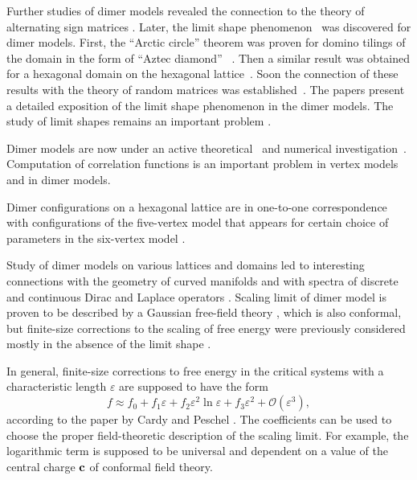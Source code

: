 \documentclass{article}
\begin{document}
Further studies of dimer models revealed the connection to the theory of alternating sign matrices
\cite{elkies1992alternating1,elkies1992alternating2}. Later, the limit shape
phenomenon~\cite{vershik1977kerov} was discovered for dimer models. First, the ``Arctic circle''
theorem was proven for domino tilings of the domain in the form of ``Aztec diamond''
~\cite{1998math......1068J}. Then a similar result was obtained for a hexagonal domain on the
hexagonal lattice~\cite{cohn1998shape}. Soon the connection of these results with the theory of
random matrices was established~\cite{johansson2002non}. The papers
\cite{kenyon2006dimers,kenyon2009lectures} present a detailed exposition of the limit shape
phenomenon in the dimer models. The study of limit shapes remains an important problem
\cite{borodin2010q,di2018tangent}.

Dimer models are now under an active
theoretical~\cite{zj2000,ferrari} and numerical investigation~\cite{ks2018}. Computation of
correlation functions is an important problem in vertex models \cite{colomo2012approach} and in dimer models.

Dimer configurations on a hexagonal lattice are in one-to-one correspondence with configurations of
the five-vertex model that appears for certain choice of parameters in the six-vertex model
\cite{kapitonov2012weighted,kapitonov2008five}.

Study of dimer models on various lattices and domains led to interesting connections with the
geometry of curved manifolds and with spectra of discrete and continuous Dirac and Laplace operators
\cite{kenyon2002laplacian,kenyon2000asymptotic}. Scaling limit of dimer model is proven to be
described by a Gaussian free-field theory \cite{kenyon2001dominos}, which is also conformal, but finite-size corrections to
the scaling of free energy were previously considered mostly in the absence of the limit shape
\cite{Sh_Izmailian_2019,izmailian2016finite,izmailian2011dimer,izmailian2007non,izmailian2005logarithmic}.


In general, finite-size corrections to free energy in the critical
systems with a characteristic length $\varepsilon$ are supposed to
have the form
\begin{equation*}
  f\approx f_{0}+f_{1}\varepsilon +f_{2}\varepsilon^{2}\ln\varepsilon+ f_{3}\varepsilon^{2}+\mathcal{O}(\varepsilon^{3}),
\end{equation*}
according to the paper by Cardy and Peschel \cite{cardy1988finite}.
The coefficients can be used to choose the proper field-theoretic
description of the scaling limit. For example, the logarithmic term is
supposed to be universal and dependent on a value of the central
charge ${\bf c}$ of conformal field theory.
\end{document}

